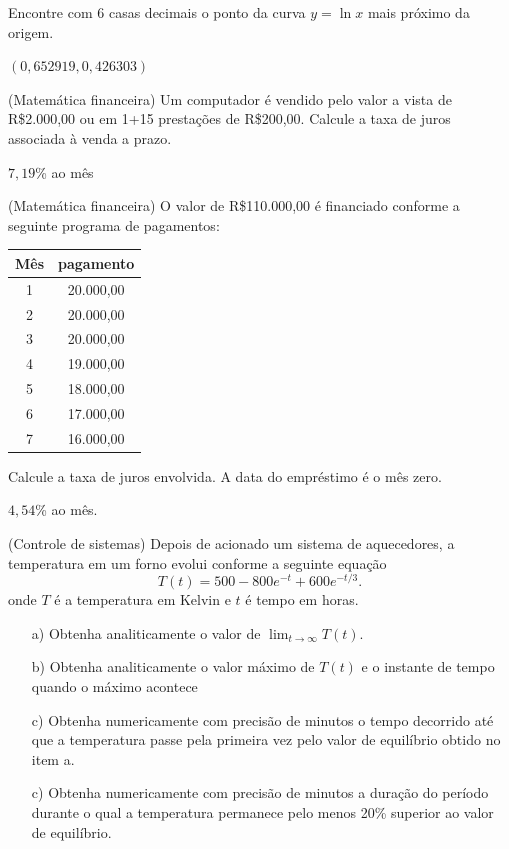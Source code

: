 \begin{exer} Encontre com 6 casas decimais o ponto da curva $y=\ln x$ mais próximo da origem.
\end{exer}
\begin{resp}
  
$(0,652919, 0,426303)$    
  
\end{resp}


\begin{exer}(Matemática financeira) Um computador é vendido pelo valor a vista de R\$2.000,00 ou em 1+15 prestações de R\$200,00. Calcule a taxa de juros associada à venda a prazo.
\end{exer}

\begin{resp}
  
$7,19$\% ao mês    
  
\end{resp}

\begin{exer}(Matemática financeira) O valor de R\$110.000,00 é financiado conforme a seguinte programa de pagamentos:

\begin{tabular}{|c|c|}
\hline
Mês & pagamento\\
\hline
1&20.000,00\\
2&20.000,00\\
3&20.000,00\\
4&19.000,00\\
5&18.000,00\\
6&17.000,00\\
7&16.000,00\\
\hline	
\end{tabular}

Calcule a taxa de juros envolvida. A data do empréstimo é o mês zero.
 \end{exer}

\begin{resp}
  
$4,54$\% ao mês.    
  
\end{resp}


\begin{exer}(Controle de sistemas) Depois de acionado um sistema de aquecedores, a temperatura em um forno  evolui conforme a seguinte equação
$$T(t)=500-800e^{-t}+600e^ {-t/3}.$$
onde $T$ é a temperatura em Kelvin e $t$ é tempo em horas.
\begin{itemize}
\item[a)] Obtenha analiticamente o valor de $\lim_{t\to\infty}T(t)$.
\item[b)] Obtenha analiticamente o valor máximo de $T(t)$ e o instante de tempo quando o máximo acontece
\item[c)] Obtenha numericamente com precisão de minutos o tempo decorrido até que a temperatura passe pela primeira vez pelo valor de equilíbrio obtido no item a.
\item[c)] Obtenha numericamente com precisão de minutos a duração do período durante o qual a temperatura permanece pelo menos 20\% superior ao valor de equilíbrio.
\end{itemize}
\end{exer}

